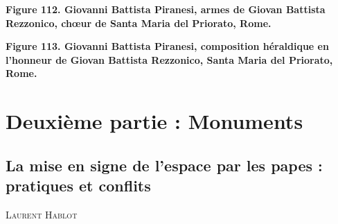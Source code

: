 \documentclass[12pt,twoside,openany]{book}
\newcommand{\PurhContributors}[1]{%
  \par\vspace{0.5\baselineskip}%
  {\normalsize\scshape #1\par}%
  \vspace{0.6\baselineskip}%
}
\begin{document}
\begin{center}
\par\small \textbf{Figure 112. Giovanni Battista Piranesi, armes de Giovan Battista Rezzonico, chœur de Santa Maria del Priorato, Rome.}
\end{center}

\begin{center}
\par\small \textbf{Figure 113. Giovanni Battista Piranesi, composition héraldique en l’honneur de Giovan Battista Rezzonico, Santa Maria del Priorato, Rome.}
\end{center}

\part*{Deuxième partie : Monuments}

\chapter{La mise en signe de l’espace par les papes : pratiques et conflits}

\PurhContributors{Laurent Hablot}
\end{document}
